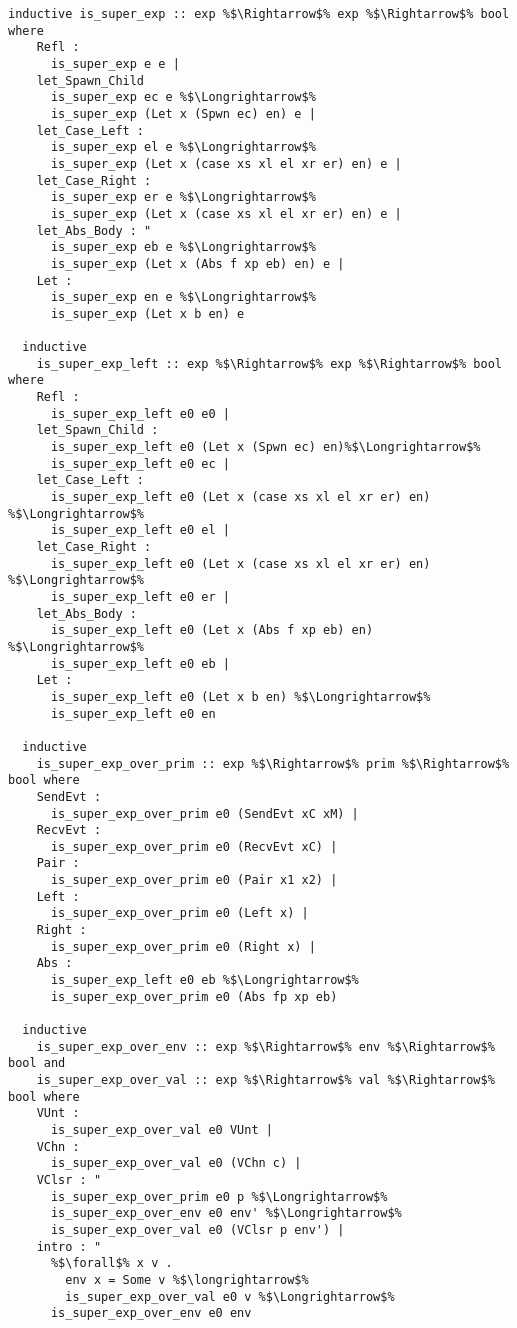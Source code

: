 \documentclass{article}
\begin{document}
\begin{lstlisting}[style=codestyle1, escapechar=\%]
  inductive is_super_exp :: exp %$\Rightarrow$% exp %$\Rightarrow$% bool where
    Refl :
      is_super_exp e e | 
    let_Spawn_Child
      is_super_exp ec e %$\Longrightarrow$%
      is_super_exp (Let x (Spwn ec) en) e |
    let_Case_Left :
      is_super_exp el e %$\Longrightarrow$%
      is_super_exp (Let x (case xs xl el xr er) en) e |
    let_Case_Right :
      is_super_exp er e %$\Longrightarrow$%
      is_super_exp (Let x (case xs xl el xr er) en) e |
    let_Abs_Body : "
      is_super_exp eb e %$\Longrightarrow$%
      is_super_exp (Let x (Abs f xp eb) en) e | 
    Let :
      is_super_exp en e %$\Longrightarrow$%
      is_super_exp (Let x b en) e

  inductive
    is_super_exp_left :: exp %$\Rightarrow$% exp %$\Rightarrow$% bool where
    Refl :
      is_super_exp_left e0 e0 | 
    let_Spawn_Child :
      is_super_exp_left e0 (Let x (Spwn ec) en)%$\Longrightarrow$%
      is_super_exp_left e0 ec |
    let_Case_Left :
      is_super_exp_left e0 (Let x (case xs xl el xr er) en) %$\Longrightarrow$%
      is_super_exp_left e0 el |
    let_Case_Right :
      is_super_exp_left e0 (Let x (case xs xl el xr er) en) %$\Longrightarrow$%
      is_super_exp_left e0 er |
    let_Abs_Body :
      is_super_exp_left e0 (Let x (Abs f xp eb) en) %$\Longrightarrow$%
      is_super_exp_left e0 eb | 
    Let :
      is_super_exp_left e0 (Let x b en) %$\Longrightarrow$%
      is_super_exp_left e0 en

  inductive
    is_super_exp_over_prim :: exp %$\Rightarrow$% prim %$\Rightarrow$% bool where
    SendEvt :
      is_super_exp_over_prim e0 (SendEvt xC xM) |
    RecvEvt :
      is_super_exp_over_prim e0 (RecvEvt xC) |
    Pair :
      is_super_exp_over_prim e0 (Pair x1 x2) |
    Left :
      is_super_exp_over_prim e0 (Left x) |
    Right :
      is_super_exp_over_prim e0 (Right x) |
    Abs :
      is_super_exp_left e0 eb %$\Longrightarrow$%
      is_super_exp_over_prim e0 (Abs fp xp eb) 

  inductive 
    is_super_exp_over_env :: exp %$\Rightarrow$% env %$\Rightarrow$% bool and
    is_super_exp_over_val :: exp %$\Rightarrow$% val %$\Rightarrow$% bool where
    VUnt :
      is_super_exp_over_val e0 VUnt |
    VChn :
      is_super_exp_over_val e0 (VChn c) |
    VClsr : "
      is_super_exp_over_prim e0 p %$\Longrightarrow$%
      is_super_exp_over_env e0 env' %$\Longrightarrow$%
      is_super_exp_over_val e0 (VClsr p env') |
    intro : "
      %$\forall$% x v .
        env x = Some v %$\longrightarrow$%
        is_super_exp_over_val e0 v %$\Longrightarrow$%
      is_super_exp_over_env e0 env


\end{lstlisting}
\end{document}
